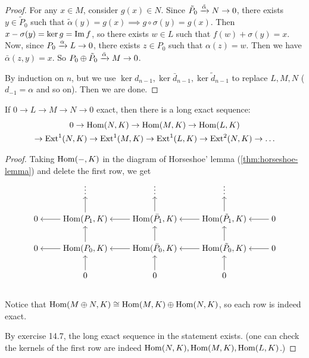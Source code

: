 \begin{theorem}
\begin{proof}
    For any $x \in M$, consider $g(x) \in N$. Since
    $\tilde P_0 \xrightarrow{\tilde \alpha} N \to 0$, there exists $y \in \tilde P_0$
    such that $\tilde\alpha(y) = g(x) \implies g\circ\sigma(y) = g(x)$.
    Then $x - \sigma(y) = \ker g = \operatorname{Im} f$, so there exists $w \in L$
    such that $f(w) + \sigma(y) = x$. Now, since $P_0 \xrightarrow{\alpha} L \to 0$,
    there exists $z \in P_0$ such that $\alpha(z) = w$. Then we have
    $\bar\alpha(z, y) = x$. So $P_0 \oplus \tilde P_0 \xrightarrow{\bar \alpha} M \to 0$.

    By induction on $n$, but we use $\ker d_{n-1}, \ker \bar d_{n-1},
    \ker \tilde d_{n-1}$ to replace $L, M, N$ ($d_{-1} = \alpha$ and so on).
    Then we are done.
  \end{proof}
\end{theorem}

\begin{theorem}
  If $0 \to L \to M \to N \to 0$ exact, then there is a long exact sequence:
  \begin{multline*} 0 \to \operatorname{Hom}(N, K) \to \operatorname{Hom}(M, K) \to \operatorname{Hom}(L, K) \\
    \to \operatorname{Ext}^1(N, K) \to \operatorname{Ext}^1(M, K) \to \operatorname{Ext}^1(L, K) \to \operatorname{Ext}^2(N, K) \to \dots
  \end{multline*}

  \begin{proof}
    Taking $\operatorname{Hom}({-}, K)$ in the diagram of Horseshoe' lemma
    (\ref{thm:horseshoe-lemma}) and delete the first row,
    we get
  \[ \begin{tikzcd}[cramped]
      & \vdots \ar[leftarrow, d] & \vdots \ar[leftarrow, d] & \vdots \ar[leftarrow, d] & \\
      0 \ar[leftarrow, r] & \Hom(P_1, K) \ar[leftarrow, r] \ar[leftarrow, d] & \Hom(\bar P_1, K) \ar[leftarrow, r] \ar[leftarrow, d] & \Hom(\tilde P_1, K) \ar[leftarrow, r] \ar[leftarrow, d] & 0 \\
      0 \ar[leftarrow, r] & \Hom(P_0, K) \ar[leftarrow, r] \ar[leftarrow, d] & \Hom(\bar P_0, K) \ar[leftarrow, r] \ar[leftarrow, d] & \Hom(\tilde P_0, K) \ar[leftarrow, r] \ar[leftarrow, d] & 0 \\
      & 0 & 0 & 0 & \\
     \end{tikzcd} \]
   Notice that $\operatorname{Hom}(M \oplus N, K) \cong \operatorname{Hom}(M, K) \oplus \operatorname{Hom}(N, K)$, so
   each row is indeed exact.

   By exercise 14.7, the long exact sequence in the statement exists.
   (one can check the kernels of the first row are indeed
   $\operatorname{Hom}(N, K), \operatorname{Hom}(M, K), \operatorname{Hom}(L, K)$.)
  \end{proof}
\end{theorem}

